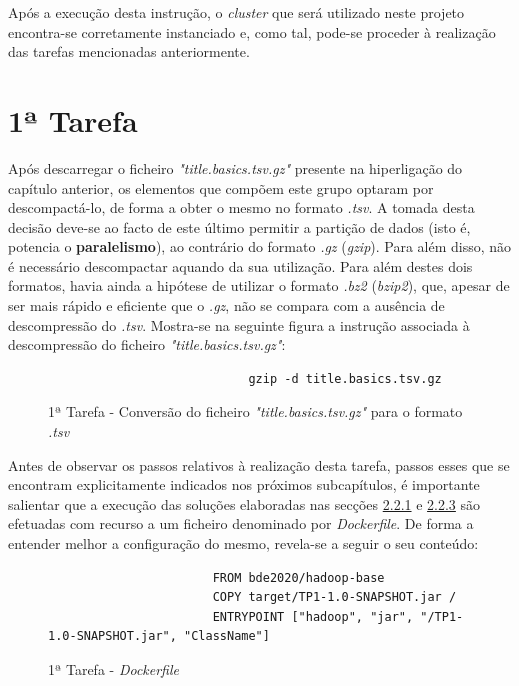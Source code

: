 \documentclass[a4paper]{report}
\begin{document}
{		Após a execução desta instrução, o \textit{cluster} que será utilizado neste projeto encontra-se corretamente instanciado e, como tal, pode-se proceder à realização das tarefas mencionadas anteriormente.

	\section{1ª Tarefa} \label{sec:Task1}
		Após descarregar o ficheiro \textit{"title.basics.tsv.gz"} presente na hiperligação do capítulo anterior, os elementos que compõem este grupo optaram por descompactá-lo, de forma a obter o mesmo no formato \textit{.tsv}.
		A tomada desta decisão deve-se ao facto de este último permitir a partição de dados (isto é, potencia o \textbf{paralelismo}), ao contrário do formato \textit{.gz} (\textit{gzip}). Para além disso, não é necessário descompactar aquando da sua utilização. Para além destes dois formatos, havia ainda a hipótese de utilizar o formato \textit{.bz2} (\textit{bzip2}), que, apesar de ser mais rápido e eficiente que o \textit{.gz}, não se compara com a ausência de descompressão do \textit{.tsv}.
		Mostra-se na seguinte figura a instrução associada à descompressão do ficheiro \textit{"title.basics.tsv.gz"}:
		\begin{figure}[H]
			{
				\color{teal}
				\begin{verbatim}
                            gzip -d title.basics.tsv.gz
				\end{verbatim}
			}
			\caption{1ª Tarefa - Conversão do ficheiro \textit{"title.basics.tsv.gz"} para o formato \textit{.tsv}}
            \label{fig:2}
		\end{figure}

		Antes de observar os passos relativos à realização desta tarefa, passos esses que se encontram explicitamente indicados nos próximos subcapítulos, é importante salientar que a execução das soluções elaboradas nas secções \hyperref[subsec:Task1-1]{2.2.1} e \hyperref[subsec:Task1-3]{2.2.3} são efetuadas com recurso a um ficheiro denominado por \textit{Dockerfile}.
		De forma a entender melhor a configuração do mesmo, revela-se a seguir o seu conteúdo:
		\begin{figure}[H]
			{
				\color{teal}
				\begin{verbatim}
					   FROM bde2020/hadoop-base
					   COPY target/TP1-1.0-SNAPSHOT.jar /
					   ENTRYPOINT ["hadoop", "jar", "/TP1-1.0-SNAPSHOT.jar", "ClassName"]
				\end{verbatim}
			}
            \caption{1ª Tarefa - \textit{Dockerfile}}
            \label{fig:3}
        \end{figure}
        
}
\end{document}
